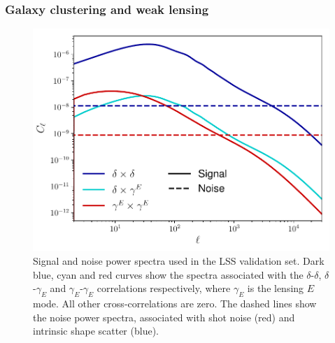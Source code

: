 \documentclass[usenatbib]{mnrasb}
\begin{document}
      \subsubsection{Galaxy clustering and weak lensing} \label{sssec:validation.suite.lss}
        \begin{figure}
          \centering
          \includegraphics[width=0.99\columnwidth]{cls_lss}
          \caption{Signal and noise power spectra used in the LSS validation set. Dark blue, cyan and red curves show the spectra associated with the $\delta$-$\delta$, $\delta$-$\gamma_E$ and $\gamma_E$-$\gamma_E$ correlations respectively, where $\gamma_E$ is the lensing $E$ mode. All other cross-correlations are zero. The dashed lines show the noise power spectra, associated with shot noise (red) and intrinsic shape scatter (blue).} \label{fig:lss_cls}
        \end{figure}
\end{document}
